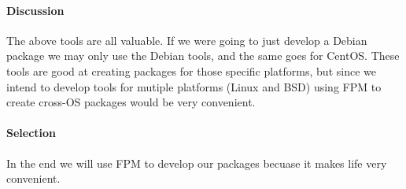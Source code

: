\paragraph{Discussion}

The above tools are all valuable.
If we were going to just develop a Debian package we may only use the Debian tools, and the same goes for CentOS.
These tools are good at creating packages for those specific platforms, but since we intend to develop tools for mutiple platforms (Linux and BSD) using FPM to create cross-OS packages would be very convenient.

\paragraph{Selection}

In the end we will use FPM to develop our packages becuase it makes life very convenient.
